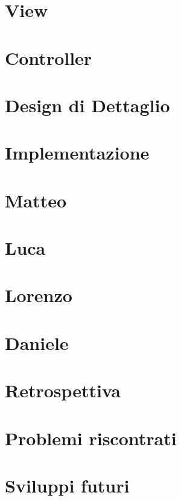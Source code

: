 \documentclass[a4paper,12pt]{article}
\begin{document}
        \section{View}

        \section{Controller}

    \section{Design di Dettaglio}

    \section{Implementazione}

        \section{Matteo}

        \section{Luca}

        \section{Lorenzo}

        \section{Daniele}

    \section{Retrospettiva}

        \section{Problemi riscontrati}

        \section{Sviluppi futuri}
\end{document}
